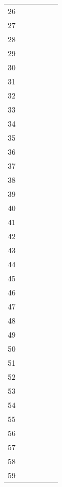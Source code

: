\begin{longtable}[l]{|c|X|X|X|X|X|}
	26 	& 					& 					& 					& 					\\ 
	27 	& 					& 					& 					&					\\ 	
	28 	& 					& 					& 					&					\\ 
	29 	& 		 			& 					& 					& 					\\ 
	30 	& 					& 					& 					& 					\\ 
	31 	& 					& 					& 					&					\\ 	
	32 	& 					& 					& 					&					\\ 
	33 	& 		 			& 					& 					& 					\\ 
	34 	& 					& 					& 					& 					\\ 
	35 	& 					& 					& 					&					\\ 	
	36 	& 					& 					& 					&					\\ 
	37 	& 		 			& 					& 					& 					\\ 
	38 	& 					& 					& 					& 					\\ 
	39 	& 					& 					& 					&					\\ 	
	40 	& 					& 					& 					&					\\ 
	41 	& 		 			& 					& 					& 					\\ 
	42 	& 					& 					& 					& 					\\ 
	43 	& 					& 					& 					&					\\ 	
	44 	& 					& 					& 					&					\\ 
	45 	& 		 			& 					& 					& 					\\ 
	46 	& 					& 					& 					& 					\\ 
	47 	& 					& 					& 					&					\\ 	
	48 	& 					& 					& 					&					\\ \hline
	49 	& 		 			& 					& 					& 					\\ 
	50 	& 					& 					& 					& 					\\ 
	51 	& 					& 					& 					&					\\ 	
	52 	& 					& 					& 					&					\\ 
	53 	& 		 			& 					& 					& 					\\ 
	54 	& 					& 					& 					& 					\\ 
	55 	& 					& 					& 					&					\\ 	
	56 	& 					& 					& 					&					\\ 
	57 	& 		 			& 					& 					& 					\\ 
	58 	& 					& 					& 					& 					\\ 
	59 	& 					& 					& 					&					\\ 	

\end{longtable}

